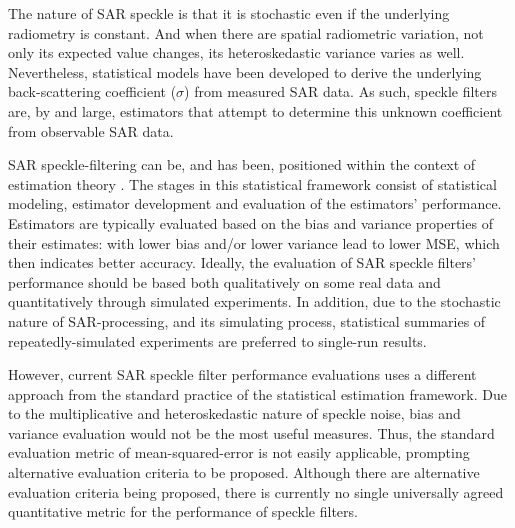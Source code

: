 The nature of SAR speckle is that
	it is stochastic even if the underlying radiometry is constant. 
And when there are spatial radiometric variation, not only its expected value changes, its heteroskedastic variance varies as well.
Nevertheless, statistical models have been developed to derive the underlying back-scattering coefficient ($\sigma$) from measured SAR data. 
As such, speckle filters are, by and large, estimators that attempt to determine this unknown coefficient from observable SAR data. 

SAR speckle-filtering can be, and has been, positioned within the context of estimation theory \cite{Touzi_2002_TGRS}. 
The stages in this statistical framework consist of statistical modeling, estimator development and evaluation of the estimators' performance. 
Estimators are typically evaluated based on the bias and variance properties of their estimates:
  with lower bias and/or lower variance lead to lower MSE, which then indicates better accuracy.
Ideally, the evaluation of SAR speckle filters' performance should be based both qualitatively on some real data and quantitatively through simulated experiments. 
In addition, due to the stochastic nature of SAR-processing, and its simulating process, 
	statistical summaries of repeatedly-simulated experiments are preferred to single-run results.

However, current SAR speckle filter performance evaluations uses a different approach
  from the standard practice of the statistical estimation framework.        
Due to the multiplicative and heteroskedastic nature of speckle noise, 
	bias and variance evaluation would not be the most useful measures. 
Thus, the standard evaluation metric of mean-squared-error is not easily applicable,
	prompting alternative evaluation criteria to be proposed.
Although there are alternative evaluation criteria being  proposed,
  there is currently  no  single universally agreed quantitative metric for the performance of speckle filters.


